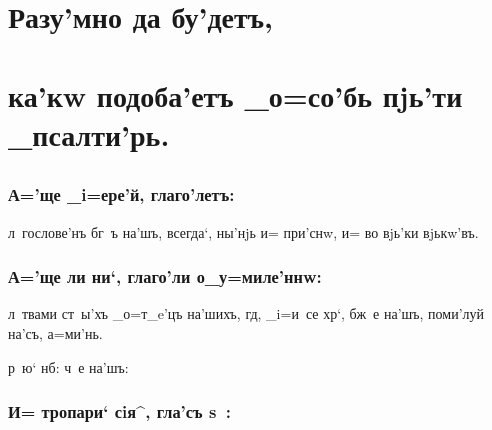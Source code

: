 \documentclass[12pt,a6paper,twoside,dvips,civil=antiqua,cs=izhitsa]{hipbook}
\begin{document}

\maketitle



\stdsecondpage


\hdrcrosspage

\cs %

\section{{\Large Разу'мно да бу'детъ,}}
\section[Разу'мно да бу'детъ,]{ка'кw подоба'етъ _о=со'бь пjь'ти _псалти'рь.}
\subsection[ка'кw подоба'етъ _о=со'бь пjь'ти _псалти'рь.]{}
\baselineskip

\subsubsection{А='ще _i=ере'й, глаго'летъ:}

л~гослове'нъ бг~ъ на'шъ, всегда`, ны'нjь и= при'снw, и= во
вjь'ки вjькw'въ.

\subsubsection{А='ще ли ни`, глаго'ли о_у=миле'ннw:}

л~твами ст~ы'хъ _о=т_e'цъ на'шихъ, гд, _i=и~се хр`,
бж~е на'шъ, поми'луй на'съ, а=ми'нь.

р~ю` нб:  ч~е на'шъ:

\subsubsection{И= тропари` сiя^, гла'съ s~:}
\end{document}
